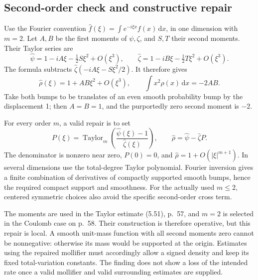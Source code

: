 \documentclass[10pt]{article}
\begin{document}
\subsection*{Second-order check and constructive repair}
Use the Fourier convention \(\widehat f(\xi)=\int e^{-i\xi x}f(x)\,\mathrm dx\), in one dimension with \(m=2\). Let \(A,B\) be the first moments of \(\psi,\zeta\), and \(S,T\) their second moments. Their Taylor series are \[\widehat\psi=1-iA\xi-\tfrac12S\xi^2+O(\xi^3),\qquad
 \widehat\zeta=1-iB\xi-\tfrac12T\xi^2+O(\xi^3).\] The formula subtracts \(\widehat\zeta(-iA\xi-S\xi^2/2)\). It therefore gives \[\widehat\rho(\xi)=1+AB\xi^2+O(\xi^3),\qquad
 \int x^2\rho(x)\,\mathrm dx=-2AB .\] Take both bumps to be translates of an even smooth probability bump by the displacement 1; then \(A=B=1\), and the purportedly zero second moment is \(-2\).\par
For every order \(m\), a valid repair is to set \[P(\xi)=\operatorname{Taylor}_m
           \left(\frac{\widehat\psi(\xi)-1}{\widehat\zeta(\xi)}\right),
 \qquad \widehat\rho=\widehat\psi-\widehat\zeta P .\] The denominator is nonzero near zero, \(P(0)=0\), and \(\widehat\rho=1+O(|\xi|^{m+1})\). In several dimensions use the total-degree Taylor polynomial. Fourier inversion gives a finite combination of derivatives of compactly supported smooth bumps, hence the required compact support and smoothness. For the actually used \(m\leq2\), centered symmetric choices also avoid the specific second-order cross term.\par
The moments are used in the Taylor estimate (5.51), p. 57, and \(m=2\) is selected in the Coulomb case on p. 58. Their construction is therefore operative, but this repair is local. A smooth unit-mass function with all second moments zero cannot be nonnegative: otherwise its mass would be supported at the origin. Estimates using the repaired mollifier must accordingly allow a signed density and keep its fixed total-variation constants. The finding does not show a loss of the intended rate once a valid mollifier and valid surrounding estimates are supplied.\par
\end{document}
